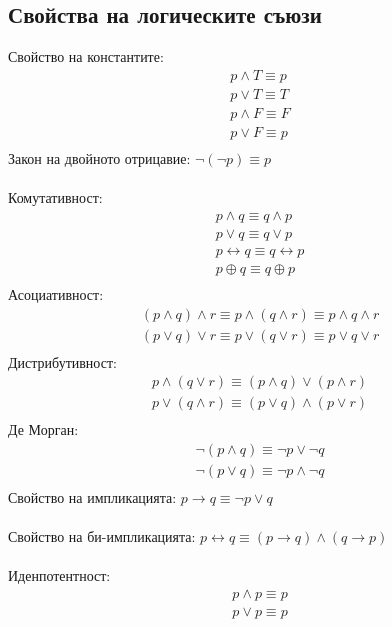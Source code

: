\documentclass[12pt]{article}
\begin{document}
    \subsection*{Свойства на логическите съюзи}
    Свойство на константите:
    \begin{gather*}
        p \land T \equiv p \\
        p \lor T \equiv T \\
        p \land F \equiv F \\
        p \lor F \equiv p \\
    \end{gather*}
    Закон на двойното отрицавие: \( \neg(\neg p) \equiv p \) \\ \\
    Комутативност: 
    \begin{gather*}
        p \land q \equiv q \land p \\
        p \lor q \equiv q \lor p \\
        p \leftrightarrow q \equiv q \leftrightarrow p \\
        p \oplus q \equiv q \oplus p \\
    \end{gather*}
    Асоциативност:
    \begin{gather*}
        (p \land q) \land r \equiv p \land (q \land r) \equiv p \land q \land r \\
        (p \lor q) \lor r \equiv p \lor (q \lor r) \equiv p \lor q \lor r \\
    \end{gather*}
    Дистрибутивност:
    \begin{gather*}
        p \land (q \lor r) \equiv (p \land q) \lor (p \land r) \\
        p \lor (q \land r) \equiv (p \lor q) \land (p \lor r) \\ 
    \end{gather*}
    Де Морган:
    \begin{gather*}
        \neg (p \land q) \equiv \neg p \lor \neg q \\
        \neg (p \lor q) \equiv \neg p \land \neg q \\
    \end{gather*}
    Свойство на импликацията: \( p \to q \equiv \neg p \lor q \) \\ \\
    Свойство на би-импликацията: \( p \leftrightarrow q \equiv ( p \to q ) \land ( q \to p ) \) \\ \\
    Иденпотентност:
    \begin{gather*}
        p \land p \equiv p \\
        p \lor p \equiv p 
    \end{gather*}
\end{document}
